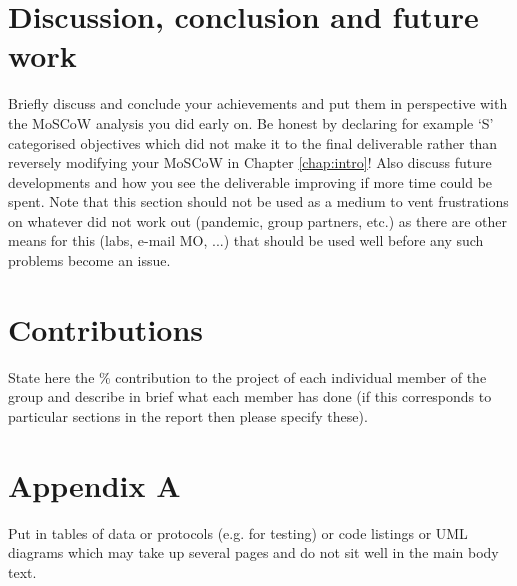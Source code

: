 \documentclass[a4paper, oneside, 11pt]{report}
\begin{document}
\chapter{Discussion, conclusion and future work}

Briefly discuss and conclude your achievements and put them in perspective with the MoSCoW analysis you did early on. Be honest by declaring for example `S' categorised objectives which did not make it to the final deliverable rather than reversely modifying your MoSCoW in Chapter \ref{chap:intro}! Also discuss future developments and how you see the deliverable improving if more time could be spent. Note that this section should not be used as a medium to vent frustrations on whatever did not work out (pandemic, group partners, etc.) as there are other means for this (labs, e-mail MO, ...) that should be used well before any such problems become an issue.





\chapter*{Contributions}

State here the \% contribution to the project of each individual member of the group and describe in brief what each member has done (if this corresponds to particular sections in the report then please specify these).

\chapter*{Appendix A}

Put in tables of data or protocols (e.g. for testing) or code listings or UML diagrams which may take up several pages and do not sit well in the main body text.
\end{document}
